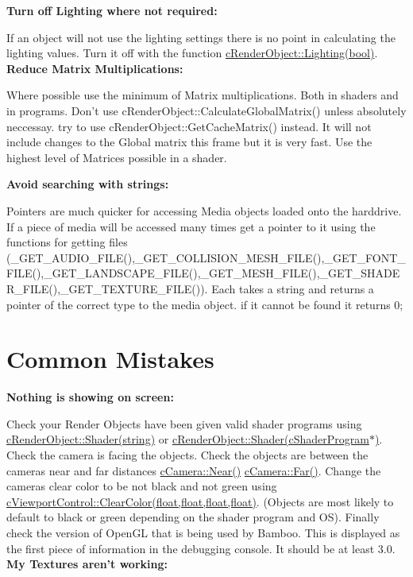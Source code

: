  {\bfseries Turn off Lighting where not required:} \par
 If an object will not use the lighting settings there is no point in calculating the lighting values. Turn it off with the function \hyperlink{classc_render_object_a67191d0fe8aceaa10052a542b3c34650}{cRenderObject::Lighting(bool)}. {\bfseries Reduce Matrix Multiplications:} \par
 Where possible use the minimum of Matrix multiplications. Both in shaders and in programs. Don't use cRenderObject::CalculateGlobalMatrix() unless absolutely neccessay. try to use cRenderObject::GetCacheMatrix() instead. It will not include changes to the Global matrix this frame but it is very fast. Use the highest level of Matrices possible in a shader. \par
 {\bfseries Avoid searching with strings:} \par
 Pointers are much quicker for accessing Media objects loaded onto the harddrive. If a piece of media will be accessed many times get a pointer to it using the functions for getting files (\_\-GET\_\-AUDIO\_\-FILE(),\_\-GET\_\-COLLISION\_\-MESH\_\-FILE(),\_\-GET\_\-FONT\_\-FILE(),\_\-GET\_\-LANDSCAPE\_\-FILE(),\_\-GET\_\-MESH\_\-FILE(),\_\-GET\_\-SHADER\_\-FILE(),\_\-GET\_\-TEXTURE\_\-FILE()). Each takes a string and returns a pointer of the correct type to the media object. if it cannot be found it returns 0; \hypertarget{_reference_lists_CommonMistakes}{}\section{Common Mistakes}\label{_reference_lists_CommonMistakes}
{\bfseries  Nothing is showing on screen: } \par
 Check your Render Objects have been given valid shader programs using \hyperlink{classc_render_object_a75f92ce4ba7b36a07e24be0643e4f020}{cRenderObject::Shader(string)} or \hyperlink{classc_render_object_abd47a58de22adfe1e9a1970f66a2f4cd}{cRenderObject::Shader(cShaderProgram$\ast$)}. Check the camera is facing the objects. Check the objects are between the cameras near and far distances \hyperlink{classc_perspective_control_af4c9bf530c680788925079d1ed64f7db}{cCamera::Near()} \hyperlink{classc_perspective_control_aa2a129ba8718923f805335bdb7661f40}{cCamera::Far()}. Change the cameras clear color to be not black and not green using \hyperlink{classc_viewport_control_ac3cee84c15d6b7bb35daf33a95a41f08}{cViewportControl::ClearColor(float,float,float,float)}. (Objects are most likely to default to black or green depending on the shader program and OS). Finally check the version of OpenGL that is being used by Bamboo. This is displayed as the first piece of information in the debugging console. It should be at least 3.0. {\bfseries  My Textures aren't working: } \par
